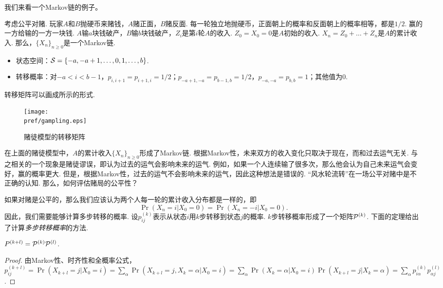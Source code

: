 我们来看一个Markov链的例子。
\begin{example}[赌徒模型]
    考虑公平对赌. 玩家$A$和$B$抛硬币来赌钱，$A$赌正面，$B$赌反面. 每一轮独立地抛硬币，正面朝上的概率和反面朝上的概率相等，都是$1/2$. 赢的一方给输的一方一块钱. $A$输$a$块钱破产，$B$输$b$块钱破产，$Z_i$是第$i$轮$A$的收入. $Z_0=X_0=0$是$A$初始的收入. $X_n=Z_0+\dots+Z_n$是$A$的累计收入. 那么，$\{X_n\}_{n\geq 0}$是一个Markov链.
    \begin{itemize}
        \item 状态空间：$\MS=\{-a,-a+1,\dots,0,1,\dots,b\}$.
        \item 转移概率：对$-a<i<b-1$，$p_{i,i+1}=p_{i+1,i}=1/2$；$p_{-a+1,-a}=p_{b-1,b}=1/2$，$p_{-a,-a}=p_{b,b}=1$；其他值为$0$.
    \end{itemize}
    转移矩阵可以画成所示的形式.
    \begin{figure}[ht]
    \centering
    \texttt{[image: \\pref/gampling.eps]}
    \caption{赌徒模型的转移矩阵}\label{fig:gambling}
    \end{figure}
\end{example}

在上面的赌徒模型中，$A$的累计收入$\{X_n\}_{n\geq 0}$形成了Markov链. 根据Markov性，未来双方的收入变化只取决于现在，而和过去运气无关. 与之相关的一个现象是赌徒谬误，即认为过去的运气会影响未来的运气. 例如，如果一个人连续输了很多次，那么他会认为自己未来运气会变好，赢的概率更大. 但是，根据Markov性，过去的运气不会影响未来的运气，因此这种想法是错误的. ``风水轮流转''在一场公平对赌中是不正确的认知. 那么，如何评估赌局的公平性？

如果对赌是公平的，那么我们应该认为两个人每一轮的累计收入分布都是一样的，即
    \[\Pr(X_n=i|X_0=0)=\Pr(X_n=-i|X_0=0).\]
因此，我们需要能够计算多步转移的概率. 设$p_{ij}^{(k)}$表示从状态$i$用$k$步转移到状态$j$的概率. $k$步转移概率形成了一个矩阵$\P^{(k)}$. 下面的定理给出了计算\emph{多步转移概率}的方法.

\begin{theorem}\label{thm:kolmogorov-chapman}
    $P^{(k+l)}=\P^{(k)}\P^{(l)}$.
\end{theorem}

\begin{proof}
由Markov性、时齐性和全概率公式，$p_{ij}^{(k+l)}=\Pr(X_{k+l}=j|X_0=i)=\sum_{\alpha}\Pr(X_{k+l}=j,X_k=\alpha|X_0=i)=\sum_{\alpha}\Pr(X_k=\alpha|X_0=i)\Pr(X_{k+l}=j|X_k=\alpha)=\sum_{\alpha} p_{i\alpha}^{(k)}p_{\alpha j}^{(l)}$.
\end{proof}

